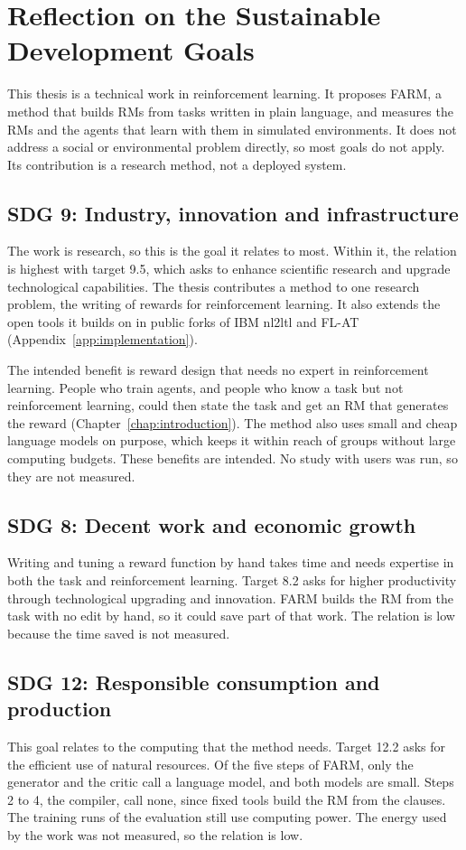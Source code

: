 \documentclass[11pt,english,listoffigures,listoftables]{tfgetsinf}
\begin{document}
\section{Reflection on the Sustainable Development Goals}
This thesis is a technical work in reinforcement learning. It proposes FARM, a method that builds RMs from tasks written in plain language, and measures the RMs and the agents that learn with them in simulated environments. It does not address a social or environmental problem directly, so most goals do not apply. Its contribution is a research method, not a deployed system.

\subsection{SDG 9: Industry, innovation and infrastructure}
The work is research, so this is the goal it relates to most. Within it, the relation is highest with target 9.5, which asks to enhance scientific research and upgrade technological capabilities. The thesis contributes a method to one research problem, the writing of rewards for reinforcement learning. It also extends the open tools it builds on in public forks of IBM nl2ltl and FL-AT (Appendix~\ref{app:implementation}).

The intended benefit is reward design that needs no expert in reinforcement learning. People who train agents, and people who know a task but not reinforcement learning, could then state the task and get an RM that generates the reward (Chapter~\ref{chap:introduction}). The method also uses small and cheap language models on purpose, which keeps it within reach of groups without large computing budgets. These benefits are intended. No study with users was run, so they are not measured.

\subsection{SDG 8: Decent work and economic growth}
Writing and tuning a reward function by hand takes time and needs expertise in both the task and reinforcement learning. Target 8.2 asks for higher productivity through technological upgrading and innovation. FARM builds the RM from the task with no edit by hand, so it could save part of that work. The relation is low because the time saved is not measured.

\subsection{SDG 12: Responsible consumption and production}
This goal relates to the computing that the method needs. Target 12.2 asks for the efficient use of natural resources. Of the five steps of FARM, only the generator and the critic call a language model, and both models are small. Steps 2 to 4, the compiler, call none, since fixed tools build the RM from the clauses. The training runs of the evaluation still use computing power. The energy used by the work was not measured, so the relation is low.
\end{document}
